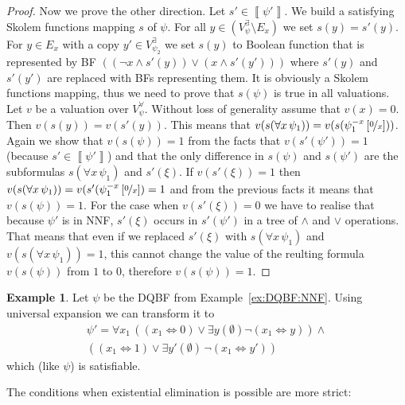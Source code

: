 \documentclass[
  digital, %
  color,
  twoside, %
  table,   %
  nolof,     %
  nolot,     %
]{fithesis3}
\theoremstyle{definition}
\newtheorem{example}{Example}
\theoremstyle{remark}
\newcommand{\seman}[1]{\left\llbracket {#1} \right\rrbracket}
\newcommand{\substitute}[2]{\left[ \nicefrac{#2}{#1} \right]}
\newcommand{\evars}[1]{V_{#1}^{\exists}}
\newcommand{\uvars}[1]{V_{#1}^{\forall}}
\newcommand{\lequal}{\Leftrightarrow}
\newcommand{\itholds}{\,}
\begin{document}
\begin{proof}
  Now we prove the other direction. Let $s' \in \seman{\psi'}$. We build a satisfying Skolem functions mapping $s$ of $\psi$. For all $y \in (\evars{\psi} \setminus E_x)$ we set $s(y) = s'(y)$. For $y \in E_x$ with a copy $y' \in \evars{\psi_2}$ we set $s(y)$ to Boolean function that is represented by BF $((\neg x \land s'(y)) \lor (x \land s'(y')))$ where $s'(y)$ and $s'(y')$ are replaced with BFs representing them. It is obviously a Skolem functions mapping, thus we need to prove that $s(\psi)$ is true in all valuations. Let $v$ be a valuation over $\uvars{\psi}$. Without loss of generality assume that $v(x) = 0$. Then $v(s(y)) = v(s'(y))$. This means that $v(s(\forall x \itholds \psi_1)) = v(s(\psi_1^{-x}\substitute{x}{0}))$. Again we show that $v(s(\psi)) = 1$ from the facts that $v(s'(\psi')) = 1$ (because $s' \in \seman{\psi'}$) and that the only difference in $s(\psi)$ and $s(\psi')$ are the subformulas $s(\forall x\itholds\psi_1)$ and $s'(\xi)$. If $v(s'(\xi)) = 1$ then $v(s(\forall x \itholds \psi_1)) = v(s'(\psi_1^{-x}\substitute{x}{0}) = 1$ and from the previous facts it means that $v(s(\psi)) = 1$. For the case when $v(s'(\xi)) = 0$ we have to realise that because $\psi'$ is in NNF, $s'(\xi)$ occurs in $s'(\psi')$ in a tree of ${\land}$ and ${\lor}$ operations. That means that even if we replaced $s'(\xi)$ with $s(\forall x \itholds \psi_1)$ and $v(s(\forall x \itholds \psi_1)) = 1$, this cannot change the value of the reulting formula $v(s(\psi))$ from $1$ to $0$, therefore $v(s(\psi)) = 1$.
\end{proof}
\begin{example}
Let $\psi$ be the DQBF from Example~\ref{ex:DQBF:NNF}. Using universal expansion we can transform it to
\begin{multline*}
    \psi' = \forall x_1 \itholds ((x_1 \lequal 0) \lor \exists y (\emptyset) \neg(x_1 \lequal y)) \land {}\\
    ((x_1 \lequal 1) \lor \exists y' (\emptyset)\itholds\neg(x_1 \lequal y'))
\end{multline*}
which (like $\psi$) is satisfiable.
\end{example}

The conditions when existential elimination is possible are more strict:
\end{document}
